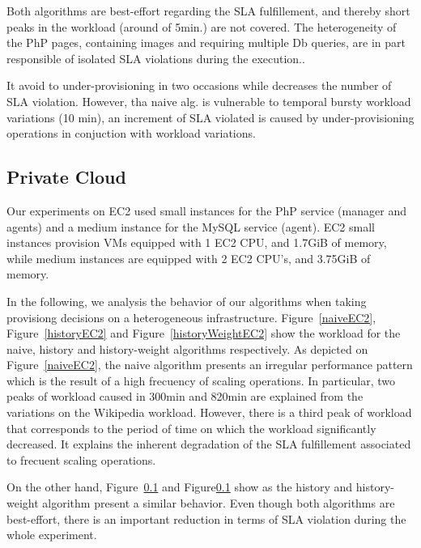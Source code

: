 Both algorithms are best-effort regarding the SLA fulfillement, and thereby short peaks in the workload (around of 5min.) are not covered. The heterogeneity of the PhP pages, containing images and requiring multiple Db queries, are in part responsible of isolated SLA violations during the execution..

It avoid to under-provisioning in two occasions  while decreases the number of SLA violation. However, tha naive alg. is vulnerable to temporal bursty workload variations (10 min), an increment of SLA violated is caused by under-provisioning operations in conjuction with workload variations. 



\subsection{Private Cloud}

Our experiments on EC2 used small instances for the PhP service (manager and agents) and  a medium instance for the MySQL service (agent). EC2 small instances provision VMs equipped with 1 EC2 CPU, and 1.7GiB of memory, while medium instances are equipped with 2 EC2 CPU's, and 3.75GiB of memory.

In the following, we analysis the behavior of our algorithms when taking provisiong decisions on a heterogeneous infrastructure. Figure~\ref{naiveEC2}, Figure~\ref{historyEC2} and Figure~\ref{historyWeightEC2} show the workload for the naive, history and history-weight algorithms respectively. As depicted on Figure~\ref{naiveEC2}, the naive algorithm presents an irregular performance pattern which is the result of a high frecuency of scaling operations. In particular, two peaks of workload caused in 300min and 820min are explained from the variations on the Wikipedia workload. However, there is a third peak of workload that corresponds to the period of time on which the workload significantly decreased. It explains the inherent degradation of the SLA fulfillement associated to frecuent scaling operations. 

On the other hand, Figure~\ref{} and Figure\ref{} show as the history and history-weight algorithm present a similar behavior. Even though both algorithms are best-effort, there is an important reduction in terms of SLA violation during the whole experiment.

